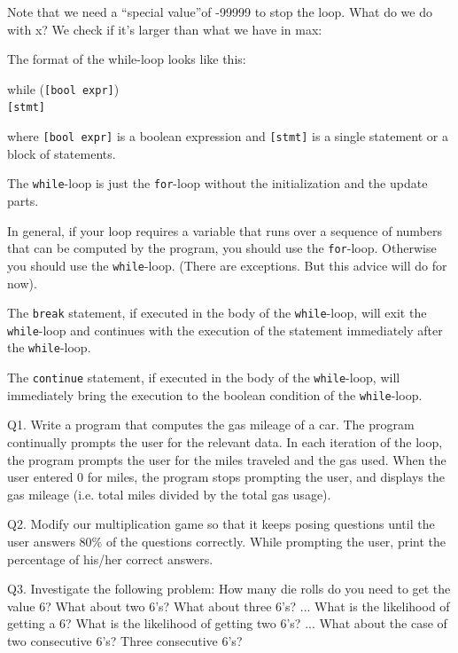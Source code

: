 Note that we need a ``special value''of -99999 to stop the loop. What
do we do with x? We check if it's larger than what we
have in max:


\newpage{}

The format of the while-loop looks like this:
\begin{center}
while (\texttt{[bool expr]})\\
\texttt{[stmt]}
\end{center}
where \texttt{[bool expr]} is a boolean expression and \texttt{[stmt]} is a single statement or a block of statements.

The \texttt{while}-loop is just the \texttt{for}-loop without the
initialization and the update parts.

In general, if your loop requires a variable that runs over a sequence
of numbers that can be computed by the program, you should use the
\texttt{for}-loop. Otherwise you should use the \texttt{while}-loop. (There
are exceptions. But this advice will do for now).

The \texttt{break} statement, if executed in the body of the
\texttt{while}-loop, will exit the \texttt{while}-loop and continues with
the execution of the statement immediately after the \texttt{while}-loop.

The \texttt{continue} statement, if executed in the body of the
\texttt{while}-loop, will immediately bring the execution to the boolean
condition of the \texttt{while}-loop.

\newpage{}


Q1. Write a program that computes the gas mileage of a car. The program
continually prompts the user for the relevant data. In each iteration of
the loop, the program prompts the user for the miles traveled and the
gas used. When the user entered 0 for miles, the program stops prompting
the user, and displays the gas mileage (i.e. total miles divided by the
total gas usage).

Q2. Modify our multiplication game so that it keeps posing questions
until the user answers 80\% of the questions correctly. While prompting
the user, print the percentage of his/her correct answers.

Q3. Investigate the following problem: How many die rolls do you need to
get the value 6? What about two 6's? What about three
6's? ... What is the likelihood of getting a 6? What is
the likelihood of getting two 6's? ... What about the
case of two consecutive 6's? Three consecutive
6's?
